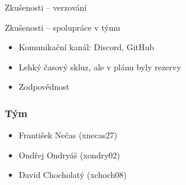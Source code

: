 \documentclass[10pt,xcolor=pdflatex,hyperref={unicode,hidelinks}]{beamer}
\begin{document}
\begin{frame}{Zkušenosti -- verzování}
\end{frame}

\begin{frame}{Zkušenosti -- spolupráce v týmu}
    \begin{itemize}
        \item<only@1,3-> Komunikační kanál: Discord, GitHub
        \item<only@3-> Lehký časový skluz, ale v plánu byly rezervy
        \item<only@3-> Zodpovědnost
    \end{itemize}
    
\end{frame}

\begin{frame}\frametitle{Tým}
    \renewcommand\UrlFont{\ttfamily\footnotesize}
    \begin{itemize}
        \item František Nečas (xnecas27)
        \item Ondřej Ondryáš (xondry02)
        \item David Chocholatý (xchoch08)
    \end{itemize}
\end{frame}

\end{document}
